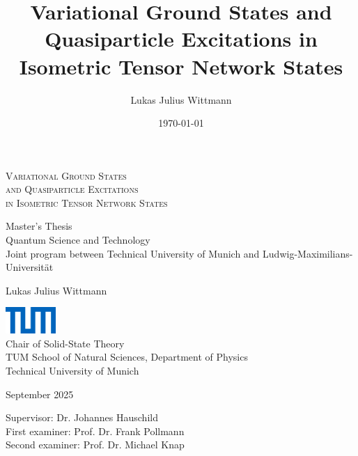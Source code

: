 \documentclass[12pt,a4paper]{book}
\title{Variational Ground States and Quasiparticle Excitations in Isometric Tensor Network States}
\author{Lukas Julius Wittmann}
\date{\today}
\begin{document}

\thispagestyle{empty}
\vspace{15mm}
\begin{center}
    \LARGE
    \textsc{Variational Ground States \\
    and Quasiparticle Excitations \\
    in Isometric Tensor Network States}
\end{center}
\vspace{4ex}
\begin{center}
    \Large
    Master's Thesis \\
    Quantum Science and Technology \\
    \vspace{0.5ex}
    \normalsize
    Joint program between Technical University of Munich and Ludwig-Maximilians-Universität
\end{center}
\vspace{4ex}
\begin{center} 
    \Large Lukas Julius Wittmann 
\end{center}
\vfill
\begin{center}
\end{center}
\vfill
\begin{center}
    \includegraphics[height=1cm]{title_page/tum_logo.png}
    \\[2ex]
    Chair of Solid-State Theory
    \\
    TUM School of Natural Sciences, Department of Physics
    \\
    Technical University of Munich
\end{center}
\newpage
\begin{center}
September 2025
\end{center}
\vfill
\begin{center}
Supervisor: Dr. Johannes Hauschild \\
First examiner: Prof. Dr. Frank Pollmann \\
Second examiner: Prof. Dr. Michael Knap
\end{center}
\restoregeometry
\end{document}
